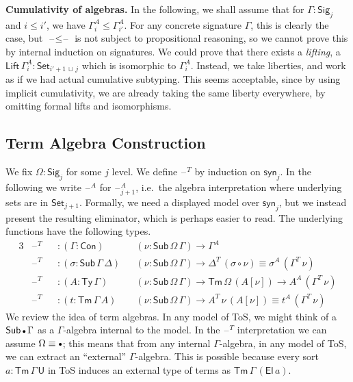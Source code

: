 \documentclass[12pt,a4paper,twoside,openany]{book}
\theoremstyle{remark}
\theoremstyle{definition}
\theoremstyle{theorem}
\newcommand{\ms}[1]{\mathsf{#1}}
\newcommand{\Con}{\mathsf{Con}}
\newcommand{\Sub}{\mathsf{Sub}}
\newcommand{\Tm}{\mathsf{Tm}}
\newcommand{\Ty}{\mathsf{Ty}}
\newcommand{\U}{\mathsf{U}}
\newcommand{\El}{\mathsf{El}}
\newcommand{\blank}{\mathord{\hspace{1pt}\text{--}\hspace{1pt}}}
\newcommand{\Set}{\mathsf{Set}}
\newcommand{\emptycon}{\scaleobj{.75}\bullet}
\newcommand{\Sig}{\mathsf{Sig}}
\newcommand{\syn}{\mathsf{syn}}
\newcommand{\lub}{\,\sqcup\,}
\begin{document}
\noindent\textbf{Cumulativity of algebras.} In the following, we shall assume
that for $\Gamma : \Sig_j$ and $i \leq i'$, we have $\Gamma^A_i \leq
\Gamma^A_{i'}$. For any concrete signature $\Gamma$, this is clearly the case,
but $\blank\!\leq\!\blank$ is not subject to propositional reasoning, so we
cannot prove this by internal induction on signatures. We could prove that there
exists a \emph{lifting}, a $\ms{Lift}\,\Gamma^A_i : \Set_{i'+1 \lub j}$
which is isomorphic to $\Gamma^A_{i}$. Instead, we take liberties, and work as
if we had actual cumulative subtyping. This seems acceptable, since by using
implicit cumulativity, we are already taking the same liberty everywhere, by
omitting formal lifts and isomorphisms.

\subsection{Term Algebra Construction}

\label{sec:fqiit-term-algebras}
We fix $\Omega : \Sig_j$ for some $j$ level. We define $\blank^T$ by induction
on $\syn_j$. In the following we write $\blank^A$ for $\blank^A_{j+1}$,
i.e.\ the algebra interpretation where underlying sets are in
$\Set_{j+1}$. Formally, we need a displayed model over $\syn_j$, but we instead
present the resulting eliminator, which is perhaps easier to read. The
underlying functions have the following types.
\begin{alignat*}{3}
  &\blank^T &&: (\Gamma : \Con)&&(\nu : \Sub\,\Omega\,\Gamma) \to \Gamma^A\\
  &\blank^T &&: (\sigma : \Sub\,\Gamma\,\Delta)&&(\nu : \Sub\,\Omega\,\Gamma) \to \Delta^T\,(\sigma \circ \nu) \equiv \sigma^A\,(\Gamma^T\,\nu)\\
  &\blank^T &&: (A : \Ty\,\Gamma)&&(\nu : \Sub\,\Omega\,\Gamma) \to \Tm\,\Omega\,(A[\nu])
  \to A^A\,(\Gamma^T\,\nu)\\
  &\blank^T &&: (t : \Tm\,\Gamma\,A)&&(\nu : \Sub\,\Omega\,\Gamma) \to A^T\,\nu\,(A[\nu]) \equiv t^A\,(\Gamma^T\,\nu)
\end{alignat*}
We review the idea of term algebras. In any model of ToS, we might think of a
$\Sub\,\emptycon\,\Gamma$ as a $\Gamma$-algebra internal to the model. In the
$\blank^T$ interpretation we can assume $\Omega \equiv \emptycon$; this means
that from any internal $\Gamma$-algebra, in any model of ToS, we can extract an
``external'' $\Gamma$-algebra. This is possible because every sort $a :
\Tm\,\Gamma\,\U$ in ToS induces an external type of terms as
$\Tm\,\Gamma\,(\El\,a)$.
\end{document}
